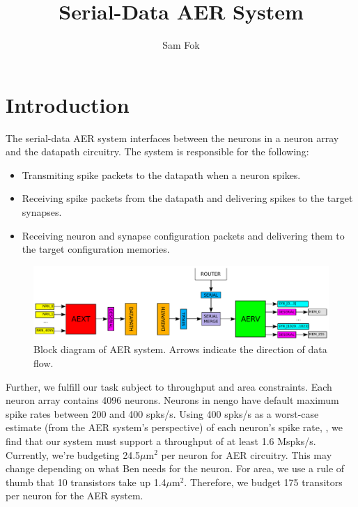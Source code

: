 \documentclass{article}
\begin{document}
\title{Serial-Data AER System}
\author{Sam Fok}
\maketitle

\tableofcontents

\section{Introduction \label{sec:intro}}

The serial-data AER system interfaces between the neurons in a neuron array
and the datapath circuitry. The system is responsible for the following:
\begin{itemize}
    \item Transmiting spike packets to the datapath when a neuron spikes. 
    \item Receiving spike packets from the datapath and delivering spikes
          to the target synapses.
    \item Receiving neuron and synapse configuration packets and delivering
          them to the target configuration memories.
\end{itemize}

\begin{figure}
    \centering
    \includegraphics[width=.95\textwidth]{img/aer_system.pdf}
    \caption{Block diagram of AER system. 
    Arrows indicate the direction of data flow.}
    \label{fig:aer_system}
\end{figure}

Further, we fulfill our task subject to throughput and area constraints. Each
neuron array contains 4096 neurons. Neurons in nengo have default maximum spike 
rates between 200 and 400 spks/s. Using 400 spks/s as a worst-case
estimate (from the AER system's perspective) of each neuron's spike rate,
, we find that our system must support a throughput of at least 1.6 Mspks/s.
Currently, we're budgeting 24.5$\mu$m$^2$ per neuron for AER circuitry. This
may change depending on what Ben needs for the neuron. For area, we use a rule 
of thumb that 10 transistors take up 1.4$\mu$m$^2$. Therefore, we budget
175 transitors per neuron for the AER system.
\end{document}
